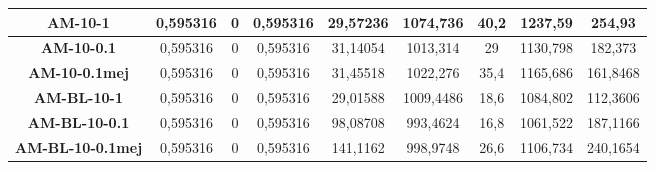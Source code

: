 \documentclass[12pt, spanish]{article}
\begin{document}
\begin{table}[H]
\begin{tabular}{|c|c|c|c|c|c|c|c|c|}
\textbf{AM-10-1}         & 0,595316                  & 0                           & 0,595316               & 29,57236   & 1074,736                  & 40,2                        & 1237,59                & 254,93     \\ \hline
\textbf{AM-10-0.1}       & 0,595316                  & 0                           & 0,595316               & 31,14054   & 1013,314                  & 29                          & 1130,798               & 182,373    \\ \hline
\textbf{AM-10-0.1mej}    & 0,595316                  & 0                           & 0,595316               & 31,45518   & 1022,276                  & 35,4                        & 1165,686               & 161,8468   \\ \hline
\textbf{AM-BL-10-1}      & 0,595316                  & 0                           & 0,595316               & 29,01588   & 1009,4486                 & 18,6                        & 1084,802               & 112,3606   \\ \hline
\textbf{AM-BL-10-0.1}    & 0,595316                  & 0                           & 0,595316               & 98,08708   & 993,4624                  & 16,8                        & 1061,522               & 187,1166   \\ \hline
\textbf{AM-BL-10-0.1mej} & 0,595316                  & 0                           & 0,595316               & 141,1162   & 998,9748                  & 26,6                        & 1106,734               & 240,1654   \\ \hline
\end{tabular}
\end{table}
\end{document}
